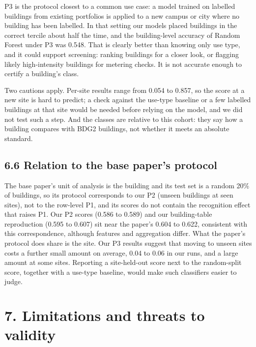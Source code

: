 \documentclass[
  10pt,
]{article}
\begin{document}
P3 is the protocol closest to a common use case: a model trained on
labelled buildings from existing portfolios is applied to a new campus
or city where no building has been labelled. In that setting our models
placed buildings in the correct tercile about half the time, and the
building-level accuracy of Random Forest under P3 was 0.548. That is
clearly better than knowing only use type, and it could support
screening: ranking buildings for a closer look, or flagging likely
high-intensity buildings for metering checks. It is not accurate enough
to certify a building's class.

Two cautions apply. Per-site results range from 0.054 to 0.857, so the
score at a new site is hard to predict; a check against the use-type
baseline or a few labelled buildings at that site would be needed before
relying on the model, and we did not test such a step. And the classes
are relative to this cohort: they say how a building compares with BDG2
buildings, not whether it meets an absolute standard.

\hypertarget{relation-to-the-base-papers-protocol}{%
\subsection{6.6 Relation to the base paper's
protocol}\label{relation-to-the-base-papers-protocol}}

The base paper's unit of analysis is the building and its test set is a
random 20\% of buildings, so its protocol corresponds to our P2 (unseen
buildings at seen sites), not to the row-level P1, and its scores do not
contain the recognition effect that raises P1. Our P2 scores (0.586 to
0.589) and our building-table reproduction (0.595 to 0.607) sit near the
paper's 0.604 to 0.622, consistent with this correspondence, although
features and aggregation differ. What the paper's protocol does share is
the site. Our P3 results suggest that moving to unseen sites costs a
further small amount on average, 0.04 to 0.06 in our runs, and a large
amount at some sites. Reporting a site-held-out score next to the
random-split score, together with a use-type baseline, would make such
classifiers easier to judge.

\hypertarget{limitations-and-threats-to-validity}{%
\section{7. Limitations and threats to
validity}\label{limitations-and-threats-to-validity}}
\end{document}

